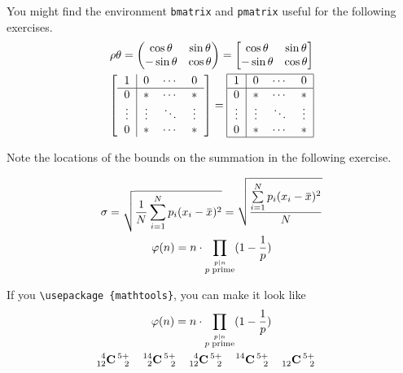 \documentclass[a4paper]{article}
\newcommand{\xbar}[1]{\mskip.5\thinmuskip\overline{\mskip-.5\thinmuskip {#1} \mskip-.5\thinmuskip}\mskip.5\thinmuskip}
\begin{document}
	You might find the environment \texttt{bmatrix} and \texttt{pmatrix}
	useful for the following exercises.
	\begin{gather}
	\rho\theta = 
		\begin{pmatrix}
			\cos \theta & \sin \theta \\
			-\sin \theta & \cos \theta
		\end{pmatrix}
		=
		\begin{bmatrix}
			\cos \theta & \sin \theta \\
			-\sin \theta & \cos \theta
		\end{bmatrix}\\
	\begin{bmatrix}
	\begin{tabular}{c | c c c}
		1 & 0 & \text{$\cdots$} & 0\\
		\hline
		0 & \text{$\ast$} & \text{$\cdots$} & \text{$\ast$}\\
		\vdots & \vdots & \text{$\ddots$} & \vdots\\
		0 & \text{$\ast$} & \text{$\cdots$} & \text{$\ast$}
	\end{tabular}
	\end{bmatrix}
	=
	\begin{tabular}{|c | c c c|}
		\hline
		1 & 0 & \text{$\cdots$} & 0\\
		\hline
		0 & \text{$\ast$} & \text{$\cdots$} & \text{$\ast$}\\
		\vdots & \vdots & \text{$\ddots$} & \vdots\\
		0 & \text{$\ast$} & \text{$\cdots$} & \text{$\ast$}\\
		\hline
	\end{tabular}
	\end{gather}
	
	Note the locations of the bounds on the summation in the following
	exercise.
	
	\begin{gather}
		\sigma = \sqrt{\frac{1}{N}
		 \sum\limits_{i=1} ^N {p_i(x_i - \xbar{x}) ^2}}= 
		 \sqrt{\dfrac{\sum\limits_{i=1}^{N} 
		 {p_i(x_i - \xbar{x}) ^2}}{N}}\\
		\varphi(n) = n \cdot 
		\prod\limits_{\stackrel{p|n}{p\; \text{prime}}} (1 - \frac{1}{p})
	\end{gather}
	
	If you \texttt{\textbackslash usepackage \{mathtools\}}, you 
	can make it look like
	\begin{gather}
		\varphi(n) = n \cdot 
		\prod\limits_{\stackrel{p|n}{p\; \text{prime}}} 
		(1 - \frac{1}{p})\\
		\prescript{4}{12}{\mathbf{C}}\prescript{5+}{2}{}\quad
		\prescript{14}{2}{\mathbf{C}}\prescript{5+}{2}{}\quad
		\prescript{4}{12}{\mathbf{C}}\prescript{5+}{2}{}\quad
		\prescript{14}{}{\mathbf{C}}\prescript{5+}{2}{}\quad
		\prescript{}{12}{\mathbf{C}}\prescript{5+}{2}{}\quad
	\end{gather}
	
\end{document}
